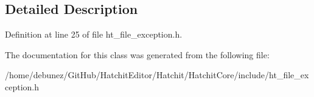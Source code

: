 \subsection{Detailed Description}


Definition at line 25 of file ht\+\_\+file\+\_\+exception.\+h.



The documentation for this class was generated from the following file\+:\begin{DoxyCompactItemize}
\item 
/home/debunez/\+Git\+Hub/\+Hatchit\+Editor/\+Hatchit/\+Hatchit\+Core/include/ht\+\_\+file\+\_\+exception.\+h\end{DoxyCompactItemize}
